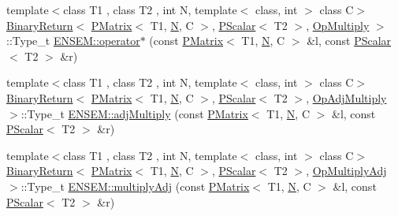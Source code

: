 \begin{DoxyCompactItemize}
\item 
{\footnotesize template$<$class T1 , class T2 , int N, template$<$ class, int $>$ class C$>$ }\\\mbox{\hyperlink{structENSEM_1_1BinaryReturn}{Binary\+Return}}$<$ \mbox{\hyperlink{classENSEM_1_1PMatrix}{P\+Matrix}}$<$ T1, \mbox{\hyperlink{operator__name__util_8cc_a7722c8ecbb62d99aee7ce68b1752f337}{N}}, C $>$, \mbox{\hyperlink{classENSEM_1_1PScalar}{P\+Scalar}}$<$ T2 $>$, \mbox{\hyperlink{structENSEM_1_1OpMultiply}{Op\+Multiply}} $>$\+::Type\+\_\+t \mbox{\hyperlink{group__primmatrix_ga9edd8305793268c1fbc1b874baa000d3}{E\+N\+S\+E\+M\+::operator$\ast$}} (const \mbox{\hyperlink{classENSEM_1_1PMatrix}{P\+Matrix}}$<$ T1, \mbox{\hyperlink{operator__name__util_8cc_a7722c8ecbb62d99aee7ce68b1752f337}{N}}, C $>$ \&l, const \mbox{\hyperlink{classENSEM_1_1PScalar}{P\+Scalar}}$<$ T2 $>$ \&r)
\item 
{\footnotesize template$<$class T1 , class T2 , int N, template$<$ class, int $>$ class C$>$ }\\\mbox{\hyperlink{structENSEM_1_1BinaryReturn}{Binary\+Return}}$<$ \mbox{\hyperlink{classENSEM_1_1PMatrix}{P\+Matrix}}$<$ T1, \mbox{\hyperlink{operator__name__util_8cc_a7722c8ecbb62d99aee7ce68b1752f337}{N}}, C $>$, \mbox{\hyperlink{classENSEM_1_1PScalar}{P\+Scalar}}$<$ T2 $>$, \mbox{\hyperlink{structENSEM_1_1OpAdjMultiply}{Op\+Adj\+Multiply}} $>$\+::Type\+\_\+t \mbox{\hyperlink{group__primmatrix_ga47a69844104af73a48b189fb08811b87}{E\+N\+S\+E\+M\+::adj\+Multiply}} (const \mbox{\hyperlink{classENSEM_1_1PMatrix}{P\+Matrix}}$<$ T1, \mbox{\hyperlink{operator__name__util_8cc_a7722c8ecbb62d99aee7ce68b1752f337}{N}}, C $>$ \&l, const \mbox{\hyperlink{classENSEM_1_1PScalar}{P\+Scalar}}$<$ T2 $>$ \&r)
\item 
{\footnotesize template$<$class T1 , class T2 , int N, template$<$ class, int $>$ class C$>$ }\\\mbox{\hyperlink{structENSEM_1_1BinaryReturn}{Binary\+Return}}$<$ \mbox{\hyperlink{classENSEM_1_1PMatrix}{P\+Matrix}}$<$ T1, \mbox{\hyperlink{operator__name__util_8cc_a7722c8ecbb62d99aee7ce68b1752f337}{N}}, C $>$, \mbox{\hyperlink{classENSEM_1_1PScalar}{P\+Scalar}}$<$ T2 $>$, \mbox{\hyperlink{structENSEM_1_1OpMultiplyAdj}{Op\+Multiply\+Adj}} $>$\+::Type\+\_\+t \mbox{\hyperlink{group__primmatrix_ga1635949cdf21523d1c8bdb6d5ada65a8}{E\+N\+S\+E\+M\+::multiply\+Adj}} (const \mbox{\hyperlink{classENSEM_1_1PMatrix}{P\+Matrix}}$<$ T1, \mbox{\hyperlink{operator__name__util_8cc_a7722c8ecbb62d99aee7ce68b1752f337}{N}}, C $>$ \&l, const \mbox{\hyperlink{classENSEM_1_1PScalar}{P\+Scalar}}$<$ T2 $>$ \&r)

\end{DoxyCompactItemize}
